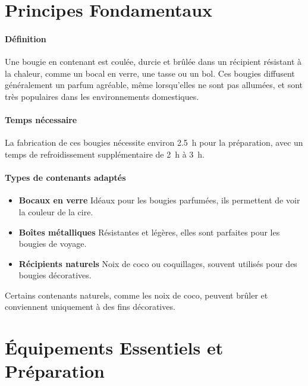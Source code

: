 \documentclass[11pt,fleqn,onecolumn,oneside]{book}
\begin{document}
\section{Principes Fondamentaux}

\paragraph{Définition} Une bougie en contenant est coulée, durcie et brûlée dans un récipient résistant à la chaleur, comme un bocal en verre, une tasse ou un bol. Ces bougies diffusent généralement un parfum agréable, même lorsqu’elles ne sont pas allumées, et sont très populaires dans les environnements domestiques.

\paragraph{Temps nécessaire} La fabrication de ces bougies nécessite environ \SI{2.5}{\hour} pour la préparation, avec un temps de refroidissement supplémentaire de \SI{2}{\hour} à \SI{3}{\hour}.

\paragraph{Types de contenants adaptés}
\begin{itemize}
    \item \textbf{Bocaux en verre} Idéaux pour les bougies parfumées, ils permettent de voir la couleur de la cire.
    \item \textbf{Boîtes métalliques} Résistantes et légères, elles sont parfaites pour les bougies de voyage.
    \item \textbf{Récipients naturels} Noix de coco ou coquillages, souvent utilisés pour des bougies décoratives.
\end{itemize}

\begin{remark}
Certains contenants naturels, comme les noix de coco, peuvent brûler et conviennent uniquement à des fins décoratives.
\end{remark}

\section{Équipements Essentiels et Préparation}
\end{document}

